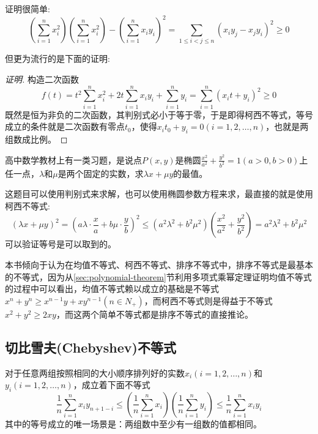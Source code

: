 证明很简单:
\begin{equation*}
  \left( \sum_{i=1}^nx_i^2 \right) \left( \sum_{i=1}^nx_i^2 \right) - \left( \sum_{i=1}^nx_iy_i \right)^2 = \sum_{1 \leqslant i < j \leqslant n}(x_iy_j-x_jy_i)^2 \geqslant 0
\end{equation*}

但更为流行的是下面的证明:

\begin{proof}[证明]
  构造二次函数
  \begin{equation*}
  f(t)=t^2\sum_{i=1}^nx_i^2+2t\sum_{i=1}^nx_iy_i+\sum_{i=1}^ny_i=\sum_{i=1}^n(x_it+y_i)^2 \geqslant 0
  \end{equation*}
 既然是恒为非负的二次函数，其判别式必小于等于零，于是即得柯西不等式，等号成立的条件就是二次函数有零点$t_0$，使得$x_it_0+y_i=0(i=1,2,\ldots,n)$，也就是两组数成比例。
\end{proof}

\begin{example}
  高中数学教材上有一类习题，是说点$P(x,y)$是椭圆$\frac{x^2}{a^2}+\frac{y^2}{b^2}=1(a>0, b>0)$上任一点，$\lambda$和$\mu$是两个固定的实数，求$\lambda x + \mu y$的最值。

  这题目可以使用判别式来求解，也可以使用椭圆参数方程来求，最直接的就是使用柯西不等式:
  \begin{equation*}
    (\lambda x + \mu y)^2 = (a\lambda \cdot \frac{x}{a} + b\mu \cdot \frac{y}{b})^2 \leqslant (a^2\lambda^2+b^2\mu^2)(\frac{x^2}{a^2}+\frac{y^2}{b^2}) = a^2\lambda^2+b^2\mu^2
  \end{equation*}
  可以验证等号是可以取到的。
\end{example}

本书倾向于认为在均值不等式、柯西不等式、排序不等式中，排序不等式是最基本的不等式，因为从\ref{sec:polynomial-theorem}节利用多项式乘幂定理证明均值不等式的过程中可以看出，均值不等式赖以成立的基础是不等式$x^n+y^n \geqslant x^{n-1}y+xy^{n-1}(n \in N_+)$，而柯西不等式则是得益于不等式$x^2+y^2 \geqslant 2xy$，而这两个简单不等式都是排序不等式的直接推论。

\subsection{切比雪夫(Chebyshev)不等式}

\begin{theorem}[切比雪夫不等式]
对于任意两组按照相同的大小顺序排列好的实数$x_i(i=1,2,\ldots,n)$和$y_i(i=1,2,\ldots,n)$，成立着下面不等式
\begin{equation}
  \label{eq:chebyshev-inequation}
  \frac{1}{n}\sum_{i=1}^nx_iy_{n+1-i}
  \leqslant \left( \frac{1}{n}\sum_{i=1}^nx_i \right) \left( \frac{1}{n}\sum_{i=1}^ny_i \right)
  \leqslant \frac{1}{n}\sum_{i=1}^nx_iy_i
\end{equation}
其中的等号成立的唯一场景是：两组数中至少有一组数的值都相同。
\end{theorem}

